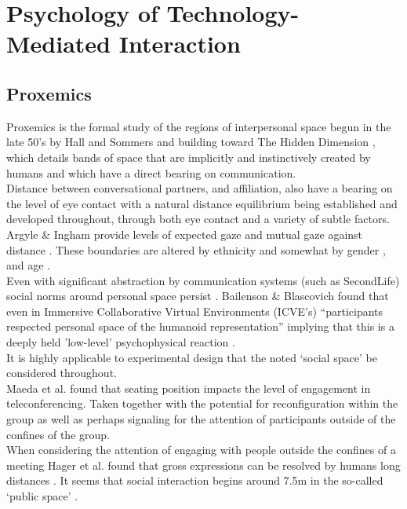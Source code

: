 \section{Psychology of Technology-Mediated Interaction}       
\subsection{Proxemics}
Proxemics is the formal study of the regions of interpersonal space begun in the late 50's by Hall and Sommers and building toward The Hidden Dimension \cite{Hall1969}, which details bands of space that are implicitly and instinctively created by humans and which have a direct bearing on communication.\\
Distance between conversational partners, and affiliation, also have a bearing on the level of eye contact \cite{Argyle1965} with a natural distance equilibrium being established and developed throughout, through both eye contact and a variety of subtle factors. Argyle \& Ingham provide levels of expected gaze and mutual gaze against distance \cite{Argyle1969}. These boundaries are altered by ethnicity \cite{Watson1966, Argyle} and somewhat by gender \cite{Bruno2013}, and age \cite{Slessor2008, Hofmann20061683}.\\
Even with significant abstraction by communication systems (such as SecondLife) social norms around personal space persist \cite{Yee2007, 6790745, bailenson2003interpersonal}. Bailenson \& Blascovich found that even in Immersive Collaborative Virtual Environments (ICVE's) ``participants respected personal space of the humanoid representation''\cite{6790745} implying that this is a deeply held 'low-level' psychophysical reaction \cite{Blascovich2002}.\\
It is highly applicable to experimental design that the noted `social space' be considered throughout.\\
Maeda et al. \cite{Maeda2004} found that seating position impacts the level of engagement in teleconferencing. Taken together with the potential for reconfiguration within the group as well as perhaps signaling for the attention of participants outside of the confines of the group.\\
When considering the attention of engaging with people outside the confines of a meeting Hager et al. found that gross expressions can be resolved by humans long distances \cite{Hager1979, Argyle}. It seems that social interaction begins around 7.5m in the so-called `public space' \cite{Hall1969}.\\                
